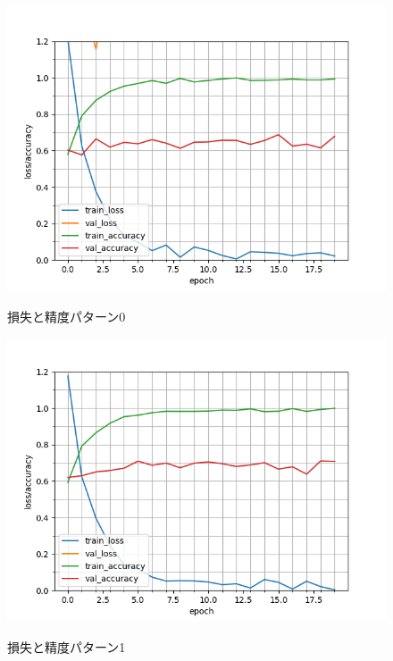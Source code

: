 \begin{figure}
	\begin{center}
		\includegraphics[scale=0.8]{./images/classify-model/loss_acuuracy_CNN_mel_0.png}
		\caption{損失と精度パターン0}
		\label{fig:CNNmel0}
		\includegraphics[scale=0.8]{./images/classify-model/loss_acuuracy_CNN_mel_1.png}
		\caption{損失と精度パターン1}
		\label{fig:CNNmel1}
	\end{center}
\end{figure}
